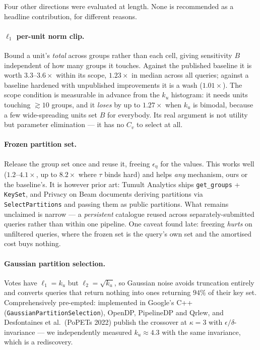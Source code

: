 \documentclass[11pt,a4paper]{article}
\newcommand{\Cv}{C_v}
\newcommand{\ku}{k_u}
\begin{document}
Four other directions were evaluated at length. None is recommended as a headline contribution,
for different reasons.

\paragraph{$\ell_1$ per-unit norm clip.} Bound a unit's \emph{total} across groups rather than each
cell, giving sensitivity $B$ independent of how many groups it touches. Against the published
baseline it is worth $3.3$--$3.6\times$ within its scope, $1.23\times$ in median across all
queries; against a baseline hardened with unpublished improvements it is a wash ($1.01\times$). The
scope condition is measurable in advance from the $\ku$ histogram: it needs units touching
$\gtrsim 10$ groups, and it \emph{loses} by up to $1.27\times$ when $\ku$ is bimodal, because a few
wide-spreading units set $B$ for everybody. Its real argument is not utility but parameter
elimination --- it has no $\Cv$ to select at all.

\paragraph{Frozen partition set.} Release the group set once and reuse it, freeing $\epsilon_\eta$
for the values. This works well ($1.2$--$4.1\times$, up to $8.2\times$ where $\tau$ binds hard) and
helps \emph{any} mechanism, ours or the baseline's. It is however prior art: Tumult Analytics ships
\texttt{get\_groups} + \texttt{KeySet}, and Privacy on Beam documents deriving partitions via
\texttt{SelectPartitions} and passing them as public partitions. What remains unclaimed is narrow
--- a \emph{persistent} catalogue reused across separately-submitted queries rather than within one
pipeline. One caveat found late: freezing \emph{hurts} on unfiltered queries, where the frozen set
is the query's own set and the amortised cost buys nothing.

\paragraph{Gaussian partition selection.} Votes have $\ell_1 = \ku$ but $\ell_2 = \sqrt{\ku}$, so
Gaussian noise avoids truncation entirely and converts queries that return nothing into ones
returning $94\%$ of their key set. Comprehensively pre-empted: implemented in Google's C++
(\texttt{GaussianPartitionSelection}), OpenDP, PipelineDP and Qrlew, and Desfontaines et al.\
(PoPETs 2022) publish the crossover at $\kappa = 3$ with $\epsilon/\delta$-invariance --- we
independently measured $\ku \approx 4.3$ with the same invariance, which is a rediscovery.
\end{document}
